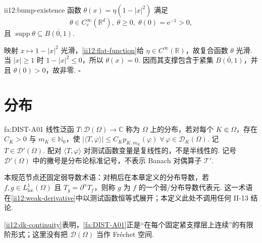 \begin{FAProposition}[B][非零光滑紧支撑函数存在]{ii12:bump-existence}
函数 \(\displaystyle \theta(x)=\eta(1-|x|^2)\)
满足
\[
\theta\in C_c^\infty(\mathbb R^d),
\;
\theta\geqslant0,
\;
\theta(0)=\mathrm{e}^{-1}>0,
\]
且 \(\displaystyle\operatorname{supp}\theta\subseteq\overline{B(0,1)}\).
\end{FAProposition}

\begin{FAProof}
映射 \(\displaystyle x\mapsto1-|x|^2\) 光滑，\autoref{ii12:flat-function}给 \(\displaystyle\eta\in C^\infty(\mathbb R)\)，故复合函数 \(\displaystyle\theta\) 光滑. 当 \(\displaystyle|x|\geqslant1\) 时 \(\displaystyle1-|x|^2\leqslant0\)，所以 \(\displaystyle\theta(x)=0\). 因而其支撑包含于紧集 \(\displaystyle\overline{B(0,1)}\)，并且 \(\displaystyle\theta(0)>0\)，故非零.
\hfill\(\square\)
\end{FAProof}

\section{分布}\label{sec:ii12-distributions}

\begin{FADefinition}[A][分布与弱导数规范节点]{fa:DIST-A01}
线性泛函 \(\displaystyle T:\mathcal D(\Omega)\to\mathbb C\)
称为 \(\displaystyle\Omega\) 上的分布，若对每个 \(\displaystyle K\Subset\Omega\)，存在 \(\displaystyle C_K>0\) 与 \(\displaystyle m_K\in\mathbb N_0\)，使 \(\displaystyle |\langle T,\varphi\rangle| \leqslant C_Kp_{K,m_K}(\varphi) \; \forall\,\varphi\in\mathcal D_K(\Omega).\)
记 \(\displaystyle T\in\mathcal D'(\Omega)\). 配对 \(\displaystyle\langle T,\varphi\rangle\) 对测试函数变量是复线性的，不是半线性的. 记号 \(\displaystyle\mathcal D'(\Omega)\) 中的撇号是分布论标准记号，不表示 Banach 对偶算子 \(\displaystyle\mathcal T'\).

本规范节点还固定弱导数术语：对稍后在本章定义的分布导数，若 \(\displaystyle f,g\in L^1_{\mathrm{loc}}(\Omega)\) 且 \(\displaystyle T_g=\partial^\alpha T_f\)，则称 \(\displaystyle g\) 为 \(\displaystyle f\) 的一个弱/分布导数代表元. 这一术语在\autoref{ii12:weak-derivative}中以测试函数恒等式展开；本定义此处不调用任何 II-13 结论.
\end{FADefinition}

\autoref{ii12:dk-continuity}表明，\autoref{fa:DIST-A01}正是“在每个固定紧支撑层上连续”的有限阶形式；这里没有把 \(\displaystyle\mathcal D(\Omega)\) 当作 Fréchet 空间.

